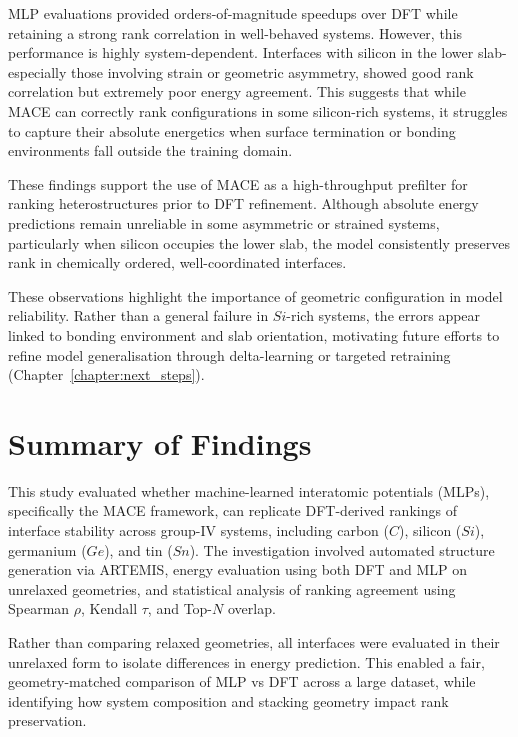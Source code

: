 MLP evaluations provided orders-of-magnitude speedups over DFT while retaining a strong rank correlation in well-behaved systems.
However, this performance is highly system-dependent.
Interfaces with silicon in the lower slab-especially those involving strain or geometric asymmetry, showed good rank correlation but extremely poor energy agreement.
This suggests that while MACE can correctly rank configurations in some silicon-rich systems, it struggles to capture their absolute energetics when surface termination or bonding environments fall outside the training domain.

These findings support the use of MACE as a high-throughput prefilter for ranking heterostructures prior to DFT refinement.
Although absolute energy predictions remain unreliable in some asymmetric or strained systems, particularly when silicon occupies the lower slab, the model consistently preserves rank in chemically ordered, well-coordinated interfaces.

\newpage These observations highlight the importance of geometric configuration in model reliability.
Rather than a general failure in $Si$-rich systems, the errors appear linked to bonding environment and slab orientation, motivating future efforts to refine model generalisation through delta-learning or targeted retraining (Chapter~\ref{chapter:next_steps}).

\section{Summary of Findings} \label{section:summary_of_findings}

This study evaluated whether machine-learned interatomic potentials (MLPs), specifically the MACE framework, can replicate DFT-derived rankings of interface stability across group-IV systems, including carbon ($C$), silicon ($Si$), germanium ($Ge$), and tin ($Sn$).
The investigation involved automated structure generation via ARTEMIS, energy evaluation using both DFT and MLP on unrelaxed geometries, and statistical analysis of ranking agreement using Spearman $\rho$, Kendall $\tau$, and Top-$N$ overlap.

Rather than comparing relaxed geometries, all interfaces were evaluated in their unrelaxed form to isolate differences in energy prediction.
This enabled a fair, geometry-matched comparison of MLP vs DFT across a large dataset, while identifying how system composition and stacking geometry impact rank preservation.

